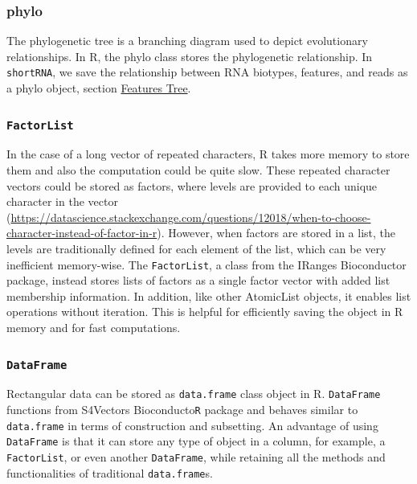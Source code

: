 \documentclass[12pt,twoside]{reedthesis}
\begin{document}
\hypertarget{phylo}{%
\subsubsection{phylo}\label{phylo}}

The phylogenetic tree is a branching diagram used to depict evolutionary
relationships. In R, the phylo class stores the phylogenetic
relationship. In \texttt{shortRNA}, we save the relationship between RNA
biotypes, features, and reads as a phylo object, section \protect\hyperlink{ft}{Features Tree}.

\hypertarget{factorlist}{%
\subsubsection{\texorpdfstring{\texttt{FactorList}}{FactorList}}\label{factorlist}}

In the case of a long vector of repeated characters, R takes more memory
to store them and also the computation could be quite slow. These
repeated character vectors could be stored as factors, where levels are
provided to each unique character in the vector
(\url{https://datascience.stackexchange.com/questions/12018/when-to-choose-character-instead-of-factor-in-r}).
However, when factors are stored in a list, the levels are traditionally
defined for each element of the list, which can be very inefficient
memory-wise. The \texttt{FactorList}, a class from the IRanges Bioconductor
package, instead stores lists of factors as a single factor vector with
added list membership information. In addition, like other AtomicList
objects, it enables list operations without iteration. This is helpful
for efficiently saving the object in R memory and for fast computations.

\hypertarget{dataframe}{%
\subsubsection{\texorpdfstring{\texttt{DataFrame}}{DataFrame}}\label{dataframe}}

Rectangular data can be stored as \texttt{data.frame} class object in R.
\texttt{DataFrame} functions from S4Vectors Bioconducto\texttt{R} package and behaves
similar to \texttt{data.frame} in terms of construction and subsetting. An
advantage of using \texttt{DataFrame} is that it can store any type of object in
a column, for example, a \texttt{FactorList}, or even another \texttt{DataFrame}, while
retaining all the methods and functionalities of traditional
\texttt{data.frame}s.
\end{document}
